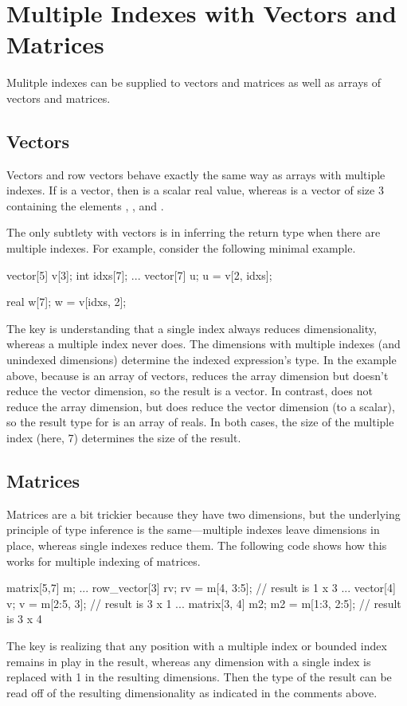 \section{Multiple Indexes with Vectors and Matrices}

Mulitple indexes can be supplied to vectors and matrices as well as
arrays of vectors and matrices.

\subsection{Vectors}

Vectors and row vectors behave exactly the same way as arrays with
multiple indexes.  If  is a vector, then  is a
scalar real value, whereas  is a vector of size 3
containing the elements , , and .

The only subtlety with vectors is in inferring the return type when
there are multiple indexes. For example, consider the following
minimal example.
%
\begin{stancode}
vector[5] v[3];
int idxs[7];
...
vector[7] u;
u = v[2, idxs];

real w[7];
w = v[idxs, 2];
\end{stancode}
%
The key is understanding that a single index always reduces
dimensionality, whereas a multiple index never does.  The dimensions
with multiple indexes (and unindexed dimensions) determine the indexed
expression's type.  In the example above, because  is an array
of vectors,  reduces the array dimension but doesn't
reduce the vector dimension, so the result is a vector.  In contrast,
 does not reduce the array dimension, but does reduce
the vector dimension (to a scalar), so the result type for  is
an array of reals.  In both cases, the size of the multiple index
(here, 7) determines the size of the result.

\subsection{Matrices}

Matrices are a bit trickier because they have two dimensions, but the
underlying principle of type inference is the same---multiple indexes
leave dimensions in place, whereas single indexes reduce them.  The
following code shows how this works for multiple indexing of matrices.
%
\begin{stancode}
matrix[5,7] m;
...
row_vector[3] rv;
rv = m[4, 3:5];    // result is 1 x 3
...
vector[4] v;
v = m[2:5, 3];     // result is 3 x 1
...
matrix[3, 4] m2;
m2 = m[1:3, 2:5];  // result is 3 x 4
\end{stancode}
%
The key is realizing that any position with a multiple index or
bounded index remains in play in the result, whereas any dimension
with a single index is replaced with 1 in the resulting dimensions.
Then the type of the result can be read off of the resulting
dimensionality as indicated in the comments above.

